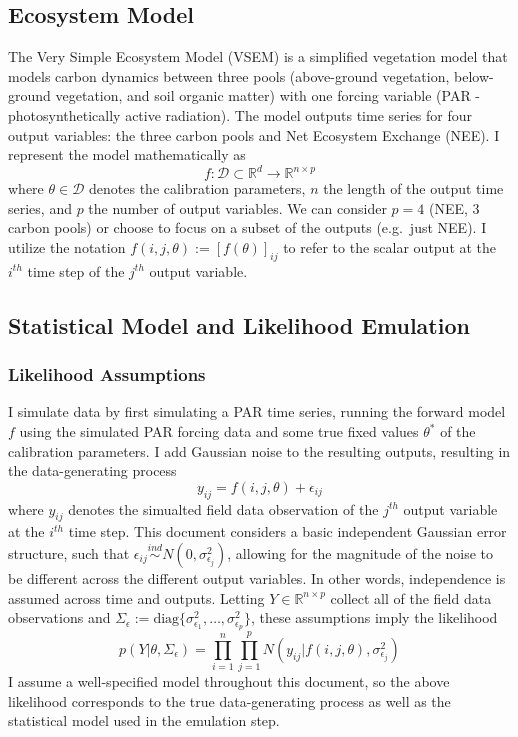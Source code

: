 \documentclass[
]{article}
\begin{document}
\hypertarget{ecosystem-model}{%
\subsection{Ecosystem Model}\label{ecosystem-model}}

The Very Simple Ecosystem Model (VSEM) is a simplified vegetation model
that models carbon dynamics between three pools (above-ground
vegetation, below-ground vegetation, and soil organic matter) with one
forcing variable (PAR - photosynthetically active radiation). The model
outputs time series for four output variables: the three carbon pools
and Net Ecosystem Exchange (NEE). I represent the model mathematically
as \[f: \mathcal{D} \subset \mathbb{R}^d \to \mathbb{R}^{n \times p}\]
where \(\theta \in \mathcal{D}\) denotes the calibration parameters,
\(n\) the length of the output time series, and \(p\) the number of
output variables. We can consider \(p = 4\) (NEE, 3 carbon pools) or
choose to focus on a subset of the outputs (e.g.~just NEE). I utilize
the notation \(f(i, j, \theta) := [f(\theta)]_{ij}\) to refer to the
scalar output at the \(i^{th}\) time step of the \(j^{th}\) output
variable.

\hypertarget{statistical-model-and-likelihood-emulation}{%
\subsection{Statistical Model and Likelihood
Emulation}\label{statistical-model-and-likelihood-emulation}}

\hypertarget{likelihood-assumptions}{%
\subsubsection{Likelihood Assumptions}\label{likelihood-assumptions}}

I simulate data by first simulating a PAR time series, running the
forward model \(f\) using the simulated PAR forcing data and some true
fixed values \(\theta^*\) of the calibration parameters. I add Gaussian
noise to the resulting outputs, resulting in the data-generating process
\[y_{ij} = f(i, j, \theta) + \epsilon_{ij}\] where \(y_{ij}\) denotes
the simualted field data observation of the \(j^{th}\) output variable
at the \(i^{th}\) time step. This document considers a basic independent
Gaussian error structure, such that
\(\epsilon_{ij} \overset{ind}{\sim} N(0, \sigma^2_{\epsilon_j})\),
allowing for the magnitude of the noise to be different across the
different output variables. In other words, independence is assumed
across time and outputs. Letting \(Y \in \mathbb{R}^{n \times p}\)
collect all of the field data observations and
\(\Sigma_\epsilon := \text{diag}\{\sigma^2_{\epsilon_1}, \dots, \sigma^2_{\epsilon_p}\}\),
these assumptions imply the likelihood
\[p(Y|\theta, \Sigma_\epsilon) = \prod_{i = 1}^{n} \prod_{j = 1}^{p} N(y_{ij}|f(i, j, \theta), \sigma^2_{\epsilon_j})\]
I assume a well-specified model throughout this document, so the above
likelihood corresponds to the true data-generating process as well as
the statistical model used in the emulation step.
\end{document}
